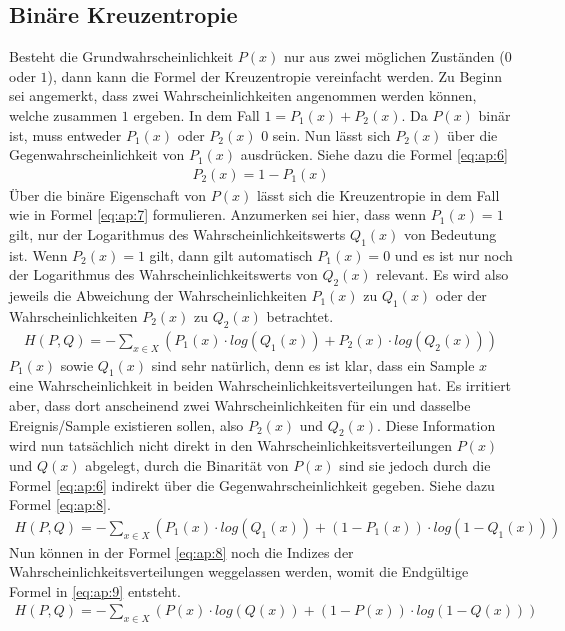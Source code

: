 \subsection{Binäre Kreuzentropie}\label{anhang:binary:kreuzentropie}
Besteht die Grundwahrscheinlichkeit $P(x)$ nur aus zwei möglichen Zuständen ($0$ oder $1$), dann kann die Formel der Kreuzentropie
vereinfacht werden. Zu Beginn sei angemerkt, dass zwei Wahrscheinlichkeiten angenommen werden können, welche zusammen
$1$ ergeben. In dem Fall $1 = P_1(x) + P_2(x)$. Da $P(x)$ binär ist, muss entweder $P_1(x)$ oder $P_2(x)$ $0$ sein.
Nun lässt sich $P_2(x)$ über die Gegenwahrscheinlichkeit von $P_1(x)$ ausdrücken. Siehe dazu die Formel \ref{eq:ap:6}
\begin{align}
    P_2(x) = 1 - P_1(x)\label{eq:ap:6}
\end{align}
Über die binäre Eigenschaft von $P(x)$ lässt sich die Kreuzentropie in dem Fall wie in Formel \ref{eq:ap:7} formulieren.
Anzumerken sei hier, dass wenn $P_1(x) = 1$ gilt, nur der Logarithmus des Wahrscheinlichkeitswerts $Q_1(x)$ von Bedeutung ist.
Wenn $P_2(x) = 1$ gilt, dann gilt automatisch $P_1(x) = 0$ und es ist nur noch der Logarithmus des Wahrscheinlichkeitswerts von
$Q_2(x)$ relevant. Es wird also jeweils die Abweichung der Wahrscheinlichkeiten $P_1(x)$ zu $Q_1(x)$ oder der Wahrscheinlichkeiten
$P_2(x)$ zu $Q_2(x)$ betrachtet.
\begin{align}
    H(P,Q) = - \sum_{x \in X} (P_1(x) \cdot log(Q_1(x)) + P_2(x) \cdot log(Q_2(x)))\label{eq:ap:7}
\end{align}
$P_1(x)$ sowie $Q_1(x)$ sind sehr natürlich, denn es ist klar, dass ein Sample $x$ eine Wahrscheinlichkeit
in beiden Wahrscheinlichkeitsverteilungen hat. Es irritiert aber, dass dort anscheinend zwei Wahrscheinlichkeiten für ein und
dasselbe Ereignis/Sample existieren sollen, also $P_2(x)$ und $Q_2(x)$. Diese Information wird nun tatsächlich nicht direkt in den
Wahrscheinlichkeitsverteilungen $P(x)$ und $Q(x)$ abgelegt, durch die Binarität von $P(x)$ sind sie jedoch durch die Formel
\ref{eq:ap:6} indirekt über die Gegenwahrscheinlichkeit gegeben. Siehe dazu Formel \ref{eq:ap:8}.
\begin{align}
    H(P,Q) = - \sum_{x \in X} (P_1(x) \cdot log(Q_1(x)) + (1 - P_1(x)) \cdot log(1 - Q_1(x)))\label{eq:ap:8}
\end{align}
Nun können in der Formel \ref{eq:ap:8} noch die Indizes der Wahrscheinlichkeitsverteilungen weggelassen werden, womit
die Endgültige Formel in \ref{eq:ap:9} entsteht.
\begin{align}
    H(P,Q) = - \sum_{x \in X} (P(x) \cdot log(Q(x)) + (1 - P(x)) \cdot log(1 - Q(x)))\label{eq:ap:9}
\end{align}
